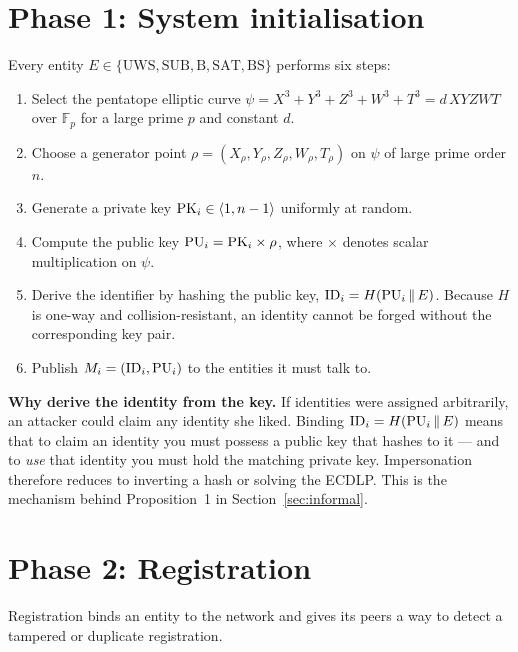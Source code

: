 \section{Phase 1: System initialisation}

Every entity $E \in \{\mathrm{UWS, SUB, B, SAT, BS}\}$ performs six steps:

\begin{enumerate}
\item Select the pentatope elliptic curve $\psi = X^3+Y^3+Z^3+W^3+T^3 = d\,XYZWT$ over
      $\mathbb{F}_p$ for a large prime $p$ and constant $d$.
\item Choose a generator point $\rho = (X_\rho,Y_\rho,Z_\rho,W_\rho,T_\rho)$ on $\psi$ of
      large prime order $n$.
\item Generate a private key $\mathrm{PK}_i \in \langle 1, n-1 \rangle$ uniformly at random.
\item Compute the public key $\mathrm{PU}_i = \mathrm{PK}_i \times \rho$, where $\times$ denotes scalar
      multiplication on $\psi$.
\item Derive the identifier by hashing the public key, $\mathrm{ID}_i = H(\mathrm{PU}_i \,\|\, E)$. Because
      $H$ is one-way and collision-resistant, an identity cannot be forged without the
      corresponding key pair.
\item Publish $M_i = (\mathrm{ID}_i, \mathrm{PU}_i)$ to the entities it must talk to.
\end{enumerate}

\begin{keybox}
\textbf{Why derive the identity from the key.} If identities were assigned arbitrarily, an
attacker could claim any identity she liked. Binding $\mathrm{ID}_i = H(\mathrm{PU}_i \,\|\, E)$ means that to
claim an identity you must possess a public key that hashes to it --- and to \emph{use} that
identity you must hold the matching private key. Impersonation therefore reduces to
inverting a hash or solving the ECDLP. This is the mechanism behind Proposition~1 in
Section~\ref{sec:informal}.
\end{keybox}

\section{Phase 2: Registration}

Registration binds an entity to the network and gives its peers a way to detect a tampered
or duplicate registration.

